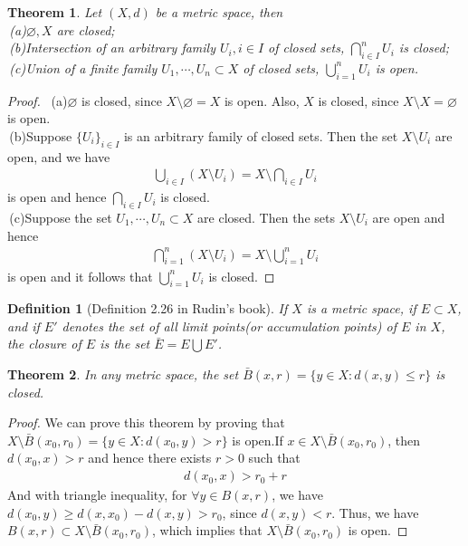 \documentclass[12pt,leqno]{amsart}
\newtheorem{theorem}{Theorem}[section]
\newtheorem{definition}{Definition}[section]
\theoremstyle{definition}
\begin{document}
\medskip

\begin{theorem}
Let $(X,d)$ be a metric space, then\\
\hspace*{1em}\,(a)$\varnothing, X$ are closed;\\
\hspace*{1em}\,(b)Intersection of an arbitrary family $U_i,i\in I$ of closed sets, $\bigcap^n_{i\in I}U_i$ is closed;\\
\hspace*{1em}\,(c)Union of a finite family $U_1, \cdots, U_n \subset X$ of closed sets, $\bigcup^n_{i=1}U_i$ is open.
\end{theorem}
\begin{proof}
$ $\newline 
\hspace*{1em}\,(a)$\varnothing$ is closed, since $X\setminus \varnothing = X$ is open. Also, $X$ is closed, since $X\setminus X = \varnothing$ is open.\\
\hspace*{1em}\,(b)Suppose $\{U_i\}_{i\in I}$ is an arbitrary family of closed sets. Then the set $X\setminus U_i$ are open, and we have 
\begin{align*}
    \bigcup_{i\in I} (X\setminus U_i) = X \setminus \bigcap_{i\in I} U_i
\end{align*}
is open and hence $\bigcap_{i\in I} U_i$ is closed.\\
\hspace*{1em}\,(c)Suppose the set $U_1, \cdots, U_n \subset X$ are closed. Then the sets $X\setminus U_i$ are open and hence
\begin{align*}
    \bigcap^n_{i=1} (X\setminus U_i) = X \setminus \bigcup^n_{i=1} U_i
\end{align*}
is open and it follows that $\bigcup^n_{i=1} U_i$ is closed.
\end{proof}

\begin{definition}[Definition 2.26 in Rudin's book]
If $X$ is a metric space, if $E\subset X$, and if $E'$ denotes the set of all limit points(or accumulation points) of $E$ in $X$, the closure of $E$ is the set $\bar{E} = E \bigcup E'$.
\end{definition}

\medskip

\begin{theorem}
In any metric space, the set $\bar{B}(x,r) = \{y\in X: d(x,y)\leq r\}$ is closed.
\end{theorem}
\begin{proof}
We can prove this theorem by proving that $X\setminus \bar{B}(x_0,r_0) = \{y\in X: d(x_0,y) > r\}$ is open.If $x\in X\setminus\bar{B}(x_0,r_0)$, then $d(x_0,x) > r$ and hence there exists $r > 0$ such that
\begin{align*}
    d(x_0,x) > r_0 + r
\end{align*}
And with triangle inequality, for $\forall y\in B(x,r)$, we have $d(x_0,y) \geq d(x,x_0) - d(x,y) > r_0$, since $d(x,y) < r$. Thus, we have $B(x,r)\subset X\setminus \bar{B}(x_0,r_0)$, which implies that $X\setminus \bar{B}(x_0,r_0)$ is open.
\end{proof}
\end{document}
